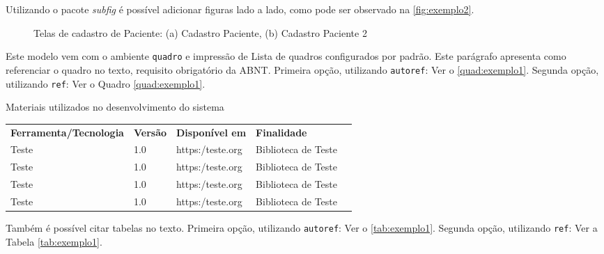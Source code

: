 Utilizando o pacote \textit{subfig} é possível adicionar figuras lado a lado, como pode ser observado na \autoref{fig:exemplo2}.

\begin{figure}[htb]
  \caption{Telas de cadastro de Paciente: (a) Cadastro Paciente, (b) Cadastro Paciente 2}
  \label{fig:exemplo2}
  \centering
  \hspace{0.15cm}

  \fonte{}
\end{figure}

Este modelo vem com o ambiente \texttt{quadro} e impressão de Lista de quadros
configurados por padrão.  Este parágrafo apresenta como referenciar o quadro no texto, requisito obrigatório da ABNT. Primeira opção, utilizando \texttt{autoref}: Ver o \autoref{quad:exemplo1}. Segunda opção, utilizando  \texttt{ref}: Ver o Quadro \ref{quad:exemplo1}.

\begin{tabframed}[htb]%
  \caption{Materiais utilizados no desenvolvimento do sistema}%
  \label{quad:exemplo1}%
  \renewcommand{\arraystretch}{1.5}
  \begin{tabular}{|l|l|l|l|l}
    \cline{1-4}
    \textbf{Ferramenta/Tecnologia} & \textbf{Versão} & \textbf{Disponível em} & \textbf{Finalidade}   \\ \cline{1-4}
    Teste                          & 1.0             & https:/teste.org       & Biblioteca de Teste & \\ \cline{1-4}
    Teste                          & 1.0             & https:/teste.org       & Biblioteca de Teste & \\ \cline{1-4}
    Teste                          & 1.0             & https:/teste.org       & Biblioteca de Teste & \\ \cline{1-4}
    Teste                          & 1.0             & https:/teste.org       & Biblioteca de Teste & \\ \cline{1-4}
  \end{tabular}
  \fonte{}%
\end{tabframed}


Também é possível citar tabelas no texto. Primeira opção, utilizando \texttt{autoref}: Ver o \autoref{tab:exemplo1}. Segunda opção, utilizando  \texttt{ref}: Ver a Tabela \ref{tab:exemplo1}.


